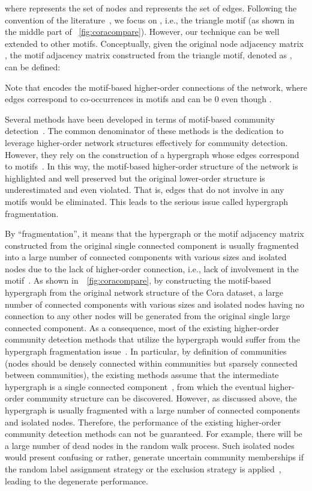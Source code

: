 \documentclass[sigconf]{acmart}
\begin{document}
where  represents the set of  nodes and  represents the set of  edges. Following the convention of the literature~\cite{holland1977method,newman2003social,prat2016put}, we focus on , i.e., the triangle motif (as shown in the middle part of \figurename~\ref{fig:coracompare}). However, our technique can be well extended to other motifs. Conceptually, given the original node adjacency matrix , the motif adjacency matrix constructed from the triangle motif, denoted as , can be defined:

Note that  encodes the motif-based higher-order connections of the network, where edges correspond to co-occurrences in motifs and  can be 0 even though .

Several methods have been developed in terms of motif-based community detection~\cite{benson2016higher,tsourakakis2017scalable}. The common denominator of these methods is the dedication to leverage higher-order network structures effectively for community detection. However, they rely on the construction of a hypergraph whose edges correspond to motifs~\cite{benson2016higher}. In this way, the motif-based higher-order structure of the network is highlighted and well preserved but the original lower-order structure is underestimated and even violated. That is, edges that do not involve in any motifs would be eliminated. This leads to the serious issue called hypergraph fragmentation.

By ``fragmentation'', it means that the hypergraph or the motif adjacency matrix constructed from the original single connected component is usually fragmented into a large number of connected components with various sizes and isolated nodes due to the lack of higher-order connection, i.e., lack of involvement in the motif~\cite{zhao2015gsparsify}. As shown in~\figurename~\ref{fig:coracompare}, by constructing the motif-based hypergraph from the original network structure of the Cora dataset, a large number of connected components with various sizes and isolated nodes having no connection to any other nodes will be generated from the original single large connected component. As a consequence, most of the existing higher-order community detection methods that utilize the hypergraph would suffer from the hypergraph fragmentation issue~\cite{tsourakakis2017scalable,zhao2015gsparsify,benson2016higher}. In particular, by definition of communities (nodes should be densely connected within communities but sparsely connected between communities), the existing methods assume that the intermediate hypergraph is a single connected component~\cite{benson2016higher,tsourakakis2017scalable}, from which the eventual higher-order community structure can be discovered. However, as discussed above, the hypergraph is usually fragmented with a large number of connected components and isolated nodes. Therefore, the performance of the existing higher-order community detection methods can not be guaranteed.
For example, there will be a large number of dead nodes in the random walk process. Such isolated nodes would present confusing or rather, generate uncertain community memberships if the random label assignment strategy or the exclusion strategy is applied~\cite{kaiser2008mean}, leading to the degenerate performance.
\end{document}
